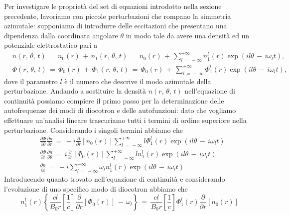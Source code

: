 Per investigare le proprietà del set di equazioni introdotto nella sezione precedente, lavoriamo con piccole perturbazioni che 
rompano la simmetria azimutale: supponiamo di introdurre delle eccitazioni che presentano una dipendenza dalla coordinata angolare 
$\theta$ in modo tale da avere una densità ed un potenziale elettrostatico pari a 
\begin{align}
    & n\left(r,\,\theta,\,t\right)\,=\,n_0\left(r\right)\,+\,n_1\left(r,\,\theta,\,t\right)\,=\,n_0\left(r\right)\,+\,\sum_{l\,=\,-\infty}^{+\infty} n_1^l\left(r\right)\exp{\left(il\theta\,-\,i\omega_l t\right)}, \\
    & \Phi\left(r,\,\theta,\,t\right)\,=\,\Phi_0\left(r\right)\,+\,\Phi_1\left(r,\,\theta,\,t\right)\,=\,\Phi_0\left(r\right)\,+\,\sum_{l\,=\,-\infty}^{+\infty} \Phi_1^l\left(r\right)\exp{\left(il\theta\,-\,i\omega_l t\right)},
\end{align}
dove il parametro $l$ è il numero che descrive il modo azimutale della perturbazione. Andando a sostituire la densità $n\left(r,\,\theta,\,t\right)$ 
nell'equazione di continuità possiamo compiere il primo passo per la determinazione delle autofrequenze dei modi di diocotron e delle autofunzioni: dato 
che vogliamo effettuare un'analisi lineare trascuriamo tutti i termini di ordine superiore nella perturbazione. Considerando i singoli 
termini abbiamo che
\begin{align}
    & \frac{\partial \Phi}{\partial \theta}\frac{\partial n}{\partial r}\,=\,-i\frac{\partial}{\partial r}\left[n_0\left(r\right)\right]\sum_{l\,=\,-\infty}^{+\infty}l\Phi_1^l\left(r\right)\exp{\left(il\theta\,-\,i\omega_l t\right)}\\
    & \frac{\partial \Phi}{\partial r}\frac{\partial n}{\partial \theta}\,=\,i\frac{\partial}{\partial r}\left[\Phi_0\left(r\right)\right]\sum_{l\,=\,-\infty}^{+\infty}ln_1^l\left(r\right)\exp{\left(il\theta\,-\,i\omega_l t\right)}\\
    & \frac{\partial n}{\partial t}\,=\,-i\sum_{l\,=\,-\infty}^{+\infty} \omega_l n_1^l\left(r\right)\exp{\left(il\theta\,-\,i\omega_l t\right)}
\end{align}
Introducendo quanto trovato nell'equazione di continuità e considerando l'evoluzione di uno specifico modo di diocotron abbiamo che
\begin{equation}
    n_1^l\left(r\right)\left\{\frac{cl}{B_0 r}\left[\frac{1}{c}\right]\frac{\partial}{\partial r}\left[\Phi_0\left(r\right)\right]\,-\,\omega_l\right\}\,=\,\frac{cl}{B_0r}\left[\frac{1}{c}\right]\Phi_1^l\left(r\right)\frac{\partial}{\partial r}\left[n_0\left(r\right)\right] 
    \label{equation: continuity_diocotronmode}
\end{equation}
